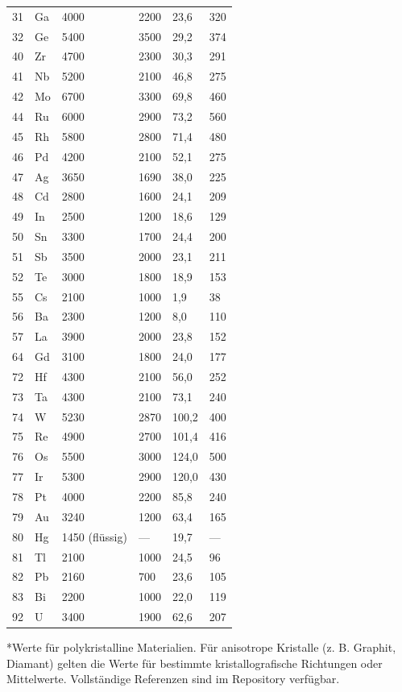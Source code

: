 \documentclass[12pt,a4paper]{article}
\begin{document}
\begin{longtable}{p{0.8cm}p{1.2cm}p{2.2cm}p{2.2cm}p{2.2cm}p{2.2cm}}
		31 & Ga & 4000 & 2200 & 23,6 & 320 \\
		32 & Ge & 5400 & 3500 & 29,2 & 374 \\
		40 & Zr & 4700 & 2300 & 30,3 & 291 \\
		41 & Nb & 5200 & 2100 & 46,8 & 275 \\
		42 & Mo & 6700 & 3300 & 69,8 & 460 \\
		44 & Ru & 6000 & 2900 & 73,2 & 560 \\
		45 & Rh & 5800 & 2800 & 71,4 & 480 \\
		46 & Pd & 4200 & 2100 & 52,1 & 275 \\
		47 & Ag & 3650 & 1690 & 38,0 & 225 \\
		48 & Cd & 2800 & 1600 & 24,1 & 209 \\
		49 & In & 2500 & 1200 & 18,6 & 129 \\
		50 & Sn & 3300 & 1700 & 24,4 & 200 \\
		51 & Sb & 3500 & 2000 & 23,1 & 211 \\
		52 & Te & 3000 & 1800 & 18,9 & 153 \\
		55 & Cs & 2100 & 1000 & 1,9 & 38 \\
		56 & Ba & 2300 & 1200 & 8,0 & 110 \\
		57 & La & 3900 & 2000 & 23,8 & 152 \\
		64 & Gd & 3100 & 1800 & 24,0 & 177 \\
		72 & Hf & 4300 & 2100 & 56,0 & 252 \\
		73 & Ta & 4300 & 2100 & 73,1 & 240 \\
		74 & W  & 5230 & 2870 & 100,2 & 400 \\
		75 & Re & 4900 & 2700 & 101,4 & 416 \\
		76 & Os & 5500 & 3000 & 124,0 & 500 \\
		77 & Ir & 5300 & 2900 & 120,0 & 430 \\
		78 & Pt & 4000 & 2200 & 85,8 & 240 \\
		79 & Au & 3240 & 1200 & 63,4 & 165 \\
		80 & Hg & 1450 (flüssig) & --- & 19,7 & --- \\
		81 & Tl & 2100 & 1000 & 24,5 & 96 \\
		82 & Pb & 2160 & 700 & 23,6 & 105 \\
		83 & Bi & 2200 & 1000 & 22,0 & 119 \\
		92 & U  & 3400 & 1900 & 62,6 & 207 \\
		\bottomrule
	\end{longtable}
	*Werte für polykristalline Materialien. Für anisotrope Kristalle (z. B. Graphit, Diamant) gelten die Werte für bestimmte kristallografische Richtungen oder Mittelwerte. Vollständige Referenzen sind im Repository verfügbar.
	
\end{document}

